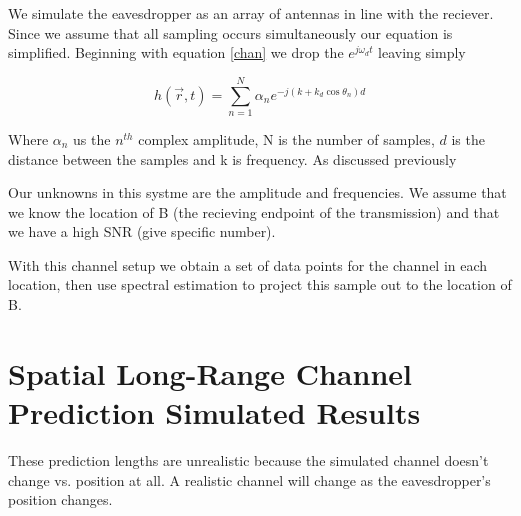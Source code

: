 \documentclass[11pt]{article} %
\begin{document}
We simulate the eavesdropper as an array of antennas in line with the reciever. Since we assume that all sampling occurs simultaneously our equation is simplified. Beginning with equation \ref{chan} we drop the $e^{j\omega_d t}$ leaving simply


\begin{equation}\label{chan}
h(\vec{r},t)= \sum_{n=1}^N \alpha_n e^{-j(k+k_d\cos\theta_n)d}
\end{equation}

 Where $\alpha_n$ us the $n^{th}$ complex amplitude, N is the number of samples, $d$ is the distance between the samples and k is frequency. As discussed previously 

Our unknowns in this systme are the amplitude and frequencies. We assume that we know the location of B (the recieving endpoint of the transmission) and that we have a high SNR (give specific number).

With this channel setup we obtain a set of data points for the channel in each location, then use spectral estimation to project this sample out to the location of B.





\section{Spatial Long-Range Channel Prediction Simulated Results}\label{simresults}



These prediction lengths are unrealistic because the simulated channel doesn't change vs. position at all.  A realistic channel will change as the eavesdropper's position changes. 
\end{document}
